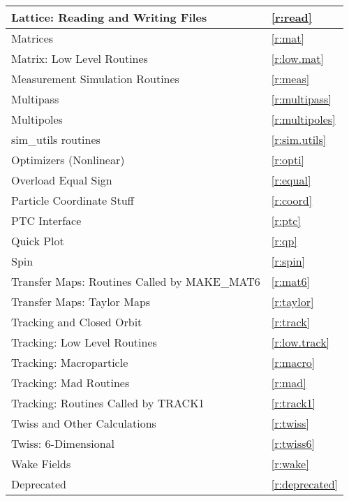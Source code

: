 \begin{center}
\begin{tabular}{|l|l|}
  Lattice: Reading and Writing Files          & \ref{r:read}           \\ \hline
  Matrices                                    & \ref{r:mat}            \\ \hline
  Matrix: Low Level Routines                  & \ref{r:low.mat}        \\ \hline
  Measurement Simulation Routines             & \ref{r:meas}           \\ \hline
  Multipass                                   & \ref{r:multipass}      \\ \hline
  Multipoles                                  & \ref{r:multipoles}     \\ \hline
  sim_utils routines                          & \ref{r:sim.utils}       \\ \hline
  Optimizers (Nonlinear)                      & \ref{r:opti}           \\ \hline
  Overload Equal Sign                         & \ref{r:equal}          \\ \hline
  Particle Coordinate Stuff                   & \ref{r:coord}          \\ \hline
  PTC Interface                               & \ref{r:ptc}            \\ \hline
  Quick Plot                                  & \ref{r:qp}             \\ \hline
  Spin                                        & \ref{r:spin}           \\ \hline
  Transfer Maps: Routines Called by MAKE_MAT6 & \ref{r:mat6}           \\ \hline
  Transfer Maps: Taylor Maps                  & \ref{r:taylor}         \\ \hline
  Tracking and Closed Orbit                   & \ref{r:track}          \\ \hline
  Tracking: Low Level Routines                & \ref{r:low.track}      \\ \hline
  Tracking: Macroparticle                     & \ref{r:macro}          \\ \hline
  Tracking: Mad Routines                      & \ref{r:mad}            \\ \hline
  Tracking: Routines Called by TRACK1         & \ref{r:track1}         \\ \hline
  Twiss and Other Calculations                & \ref{r:twiss}          \\ \hline
  Twiss: 6-Dimensional                        & \ref{r:twiss6}         \\ \hline
  Wake Fields                                 & \ref{r:wake}           \\ \hline
  Deprecated                                  & \ref{r:deprecated}     \\ \hline
\end{tabular}
\end{center}
\toffset

